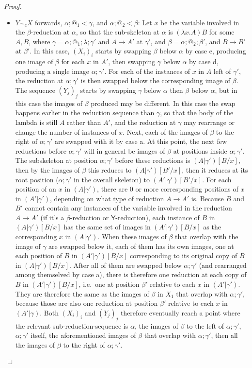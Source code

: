 \documentclass{article}
\newcommand{\tY}{\mathsf{Y}}
\theoremstyle{definition}
\theoremstyle{lemma}
\theoremstyle{remark}
\begin{document}
\begin{proof}
\begin{itemize}
\item $Y \sim_c X$ forwards, $\alpha;@_1 < \gamma$, and $\alpha;@_2 < \beta$: Let $x$ be the variable involved in the $\beta$-reduction at $\alpha$, so that the sub-skeleton at $\alpha$ is $(\lambda x. A) B$ for some $A, B$, where $\gamma = \alpha;@_1;\lambda;\gamma'$ and $A \to A'$ at $\gamma'$, and $\beta = \alpha;@_2;\beta'$, and $B \to B'$ at $\beta'$. In this case, $(X_i)_i$ starts by swapping $\beta$ below $\alpha$ by case e, producing one image of $\beta$ for each $x$ in $A'$, then swapping $\gamma$ below $\alpha$ by case d, producing a single image $\alpha;\gamma'$. For each of the instances of $x$ in $A$ left of $\gamma'$, the reduction at $\alpha;\gamma'$ is then swapped below the corresponding image of $\beta$. The sequence $(Y_j)_j$ starts by swapping $\gamma$ below $\alpha$ then $\beta$ below $\alpha$, but in this case the images of $\beta$ produced may be different. In this case the swap happens earlier in the reduction sequence than $\gamma$, so that the body of the lambda is still $A$ rather than $A'$, and the reduction at $\gamma$ may rearrange or change the number of instances of $x$. Next, each of the images of $\beta$ to the right of $\alpha;\gamma'$ are swapped with it by case a. At this point, the next few reductions before $\alpha;\gamma'$ will in general be images of $\beta$ at positions inside $\alpha;\gamma'$. The subskeleton at position $\alpha;\gamma'$ before these reductions is $(A|\gamma')[B/x]$, then by the images of $\beta$ this reduces to $(A|\gamma')[B'/x]$, then it reduces at its root position ($\alpha;\gamma'$ in the overall skeleton) to $(A'|\gamma')[B'/x]$. For each position of an $x$ in $(A|\gamma')$, there are 0 or more corresponding positions of $x$ in $(A'|\gamma')$, depending on what type of reduction $A \to A'$ is. Because $B$ and $B'$ cannot contain any instances of the variable involved in the reduction $A \to A'$ (if it's a $\beta$-reduction or $\tY$-reduction), each instance of $B$ in $(A|\gamma')[B/x]$ has the same set of images in $(A'|\gamma')[B/x]$ as the corresponding $x$ in $(A|\gamma')$. When these images of $\beta$ that overlap with the image of $\gamma$ are swapped below it, each of them has its own images, one at each position of $B$ in $(A'|\gamma')[B/x]$ corresponding to its original copy of $B$ in $(A|\gamma')[B/x]$. After all of them are swapped below $\alpha;\gamma'$ (and rearranged among themselved by case a), there is therefore one reduction at each copy of $B$ in $(A'|\gamma')[B/x]$, i.e.~one at position $\beta'$ relative to each $x$ in $(A'|\gamma')$. They are therefore the same as the images of $\beta$ in $X_1$ that overlap with $\alpha;\gamma'$, because those are also one reduction at position $\beta'$ relative to each $x$ in $(A'|\gamma)$. Both $(X_i)_i$ and $(Y_j)_j$ therefore eventually reach a point where the relevant sub-reduction-sequence is $\alpha$, the images of $\beta$ to the left of $\alpha;\gamma'$, $\alpha;\gamma'$ itself, the aforementioned images of $\beta$ that overlap with $\alpha;\gamma'$, then all the images of $\beta$ to the right of $\alpha;\gamma'$.

\end{itemize}
\end{proof}
\end{document}

